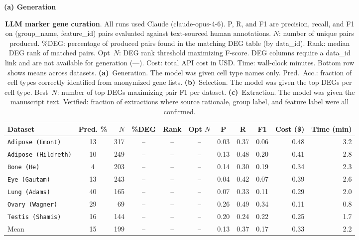 \documentclass[10pt,twocolumn]{article}
\theoremstyle{plain}
\theoremstyle{definition}
\theoremstyle{remark}
\begin{document}
\begin{table}[ht!]
  \centering
  \caption{\textbf{LLM marker gene curation}. All runs used Claude (claude-opus-4-6). P, R, and F1 are precision, recall, and F1 on (group\_name, feature\_id) pairs evaluated against text-sourced human annotations. \textbf{$N$}: number of unique pairs produced. \%DEG: percentage of produced pairs found in the matching DEG table (by data\_id). Rank: median DEG rank of matched pairs. Opt~$N$: DEG rank threshold maximizing F-score. DEG columns require a data\_id link and are not available for generation (---). Cost: total API cost in USD. Time: wall-clock minutes. Bottom row shows means across datasets. \textbf{(a)}~Generation. The model was given cell type names only. Pred.\ Acc.: fraction of cell types correctly identified from anonymized gene lists. \textbf{(b)}~Selection. The model was given the top DEGs per cell type. Best~$N$: number of top DEGs maximizing pair F1 per dataset. \textbf{(c)}~Extraction. The model was given the manuscript text. Verified: fraction of extractions where source rationale, group label, and feature label were all confirmed.}
  \label{tab:llm_curation}%
  \small
  \setlength{\tabcolsep}{4pt}

  \textbf{(a) Generation}
  \vspace{2pt}
  
  \begin{tabular}{@{}l c r ccc ccc r r@{}}
  \toprule
  Dataset & Pred. \% & $N$ & \%DEG & Rank & Opt $N$ & P & R & F1 & Cost (\$) & Time (min) \\
  \midrule
  \texttt{Adipose (Emont)}    & 13 & 317 & -- & -- & -- & 0.03 & 0.37 & 0.06 & 0.48 & 3.2 \\
  \texttt{Adipose (Hildreth)} & 10 & 249 & -- & -- & -- & 0.13 & 0.48 & 0.20 & 0.41 & 2.8 \\
  \texttt{Bone (He)}          & 4  & 203 & -- & -- & -- & 0.14 & 0.30 & 0.19 & 0.34 & 2.3 \\
  \texttt{Eye (Gautam)}       & 13 & 243 & -- & -- & -- & 0.04 & 0.42 & 0.07 & 0.39 & 2.6 \\
  \texttt{Lung (Adams)}       & 40 & 165 & -- & -- & -- & 0.07 & 0.33 & 0.11 & 0.29 & 2.0 \\
  \texttt{Ovary (Wagner)}     & 29 &  69 & -- & -- & -- & 0.26 & 0.49 & 0.34 & 0.11 & 0.8 \\
  \texttt{Testis (Shamis)}    & 16 & 144 & -- & -- & -- & 0.20 & 0.24 & 0.22 & 0.25 & 1.7 \\
  \midrule
  Mean               & 15 & 199 & -- & -- & -- & 0.13 & 0.37 & 0.17 & 0.33 & 2.2 \\
  \bottomrule
  \end{tabular}
  

\end{table}
\end{document}

